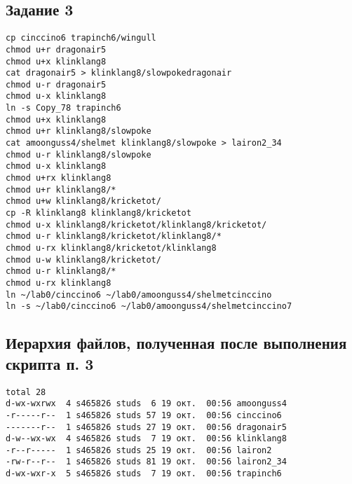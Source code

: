\subsection*{Задание 3}
\verb|cp cinccino6 trapinch6/wingull| \\
\verb|chmod u+r dragonair5| \\
\verb|chmod u+x klinklang8| \\
\verb|cat dragonair5 > klinklang8/slowpokedragonair| \\
\verb|chmod u-r dragonair5| \\
\verb|chmod u-x klinklang8| \\
\verb|ln -s Copy_78 trapinch6| \\
\verb|chmod u+x klinklang8| \\
\verb|chmod u+r klinklang8/slowpoke| \\
\verb|cat amoonguss4/shelmet klinklang8/slowpoke > lairon2_34| \\
\verb|chmod u-r klinklang8/slowpoke| \\
\verb|chmod u-x klinklang8| \\
\verb|chmod u+rx klinklang8| \\
\verb|chmod u+r klinklang8/*| \\
\verb|chmod u+w klinklang8/kricketot/| \\
\verb|cp -R klinklang8 klinklang8/kricketot| \\
\verb|chmod u-x klinklang8/kricketot/klinklang8/kricketot/| \\
\verb|chmod u-r klinklang8/kricketot/klinklang8/*| \\
\verb|chmod u-rx klinklang8/kricketot/klinklang8| \\
\verb|chmod u-w klinklang8/kricketot/| \\
\verb|chmod u-r klinklang8/*| \\
\verb|chmod u-rx klinklang8| \\
\verb|ln ~/lab0/cinccino6 ~/lab0/amoonguss4/shelmetcinccino| \\
\verb|ln -s ~/lab0/cinccino6 ~/lab0/amoonguss4/shelmetcinccino7| \\
\subsection*{Иерархия файлов, полученная после выполнения скрипта п. 3} 
\verb|total 28| \\
\verb|d-wx-wxrwx  4 s465826 studs  6 19 окт.  00:56 amoonguss4| \\
\verb|-r-----r--  1 s465826 studs 57 19 окт.  00:56 cinccino6| \\
\verb|-------r--  1 s465826 studs 27 19 окт.  00:56 dragonair5| \\
\verb|d-w--wx-wx  4 s465826 studs  7 19 окт.  00:56 klinklang8| \\
\verb|-r--r-----  1 s465826 studs 25 19 окт.  00:56 lairon2| \\
\verb|-rw-r--r--  1 s465826 studs 81 19 окт.  00:56 lairon2_34| \\
\verb|d-wx-wxr-x  5 s465826 studs  7 19 окт.  00:56 trapinch6| \\


